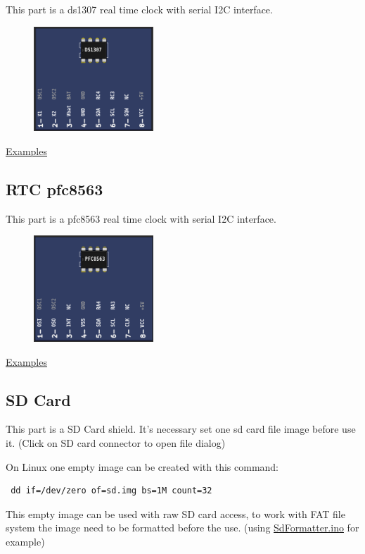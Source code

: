 This part is a ds1307 real time clock with serial I2C interface.

\begin{figure}[H]
\center
\includegraphics[width=0.4\textwidth]{img/part_ds1307.png} 
\end{figure}

\href{https://lcgamboa.github.io/picsimlab_examples/parts_RTC_ds1307.html}{Examples}


\subsection{RTC pfc8563}

This part is a pfc8563 real time clock with serial I2C interface.

\begin{figure}[H]
\center
\includegraphics[width=0.4\textwidth]{img/part_pcf8563.png} 
\end{figure}

\href{https://lcgamboa.github.io/picsimlab_examples/parts_RTC_pfc8563.html}{Examples}


\subsection{SD Card}

This part is a SD Card shield. It's necessary set one sd card file image before use it. (Click on SD card connector to open file dialog)

On Linux one empty image can be created with this command: 
\begin{verbatim}
 dd if=/dev/zero of=sd.img bs=1M count=32
\end{verbatim}
This empty image can be used with raw SD card access, to work with FAT file system  the image need to be formatted before the use. (using \href{https://github.com/greiman/SdFat/blob/master/examples/SdFormatter/SdFormatter.ino}{SdFormatter.ino} for example) 

